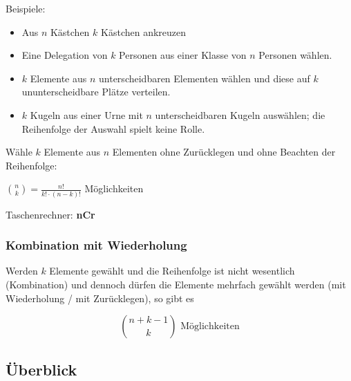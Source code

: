 \begin{multicols}{2}
Beispiele:

\begin{itemize}
\item Aus $n$ Kästchen $k$ Kästchen ankreuzen
\item Eine Delegation von $k$ Personen aus einer Klasse von $n$
Personen wählen.
\item $k$ Elemente aus $n$ unterscheidbaren Elementen wählen und diese
auf $k$ ununterscheidbare Plätze verteilen.
\item $k$ Kugeln aus einer Urne mit $n$ unterscheidbaren Kugeln
auswählen; die Reihenfolge der Auswahl spielt keine Rolle.
\end{itemize}

Wähle $k$ Elemente aus $n$ Elementen ohne Zurücklegen und ohne
Beachten der Reihenfolge:

 ${n\choose k} = \frac{n!}{k!\cdot{}(n-k)!}$ Möglichkeiten

Taschenrechner: \textbf{nCr}

\subsubsection*{Kombination mit Wiederholung}
Werden $k$ Elemente gewählt und die Reihenfolge ist nicht wesentlich
(Kombination) und dennoch dürfen die Elemente mehrfach gewählt werden
(mit Wiederholung / mit Zurücklegen), so gibt es

$${n+k-1 \choose k} \textrm { Möglichkeiten}$$ 



\end{multicols}




\subsection*{Überblick}
\hrulefill


